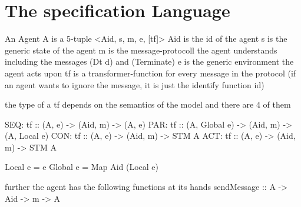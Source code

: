 \section{The specification Language}
An Agent A is a 5-tuple <Aid, s, m, e, [tf]>
Aid is the id of the agent
s is the generic state of the agent
m is the message-protocoll the agent understands including the messages (Dt d) and (Terminate)
e is the generic environment the agent acts upon
tf is a transformer-function for every message in the protocol (if an agent wants to ignore the message, it is just the identify function id)

the type of a tf depends on the semantics of the model and there are 4 of them

SEQ: tf :: (A, e) -> (Aid, m) -> (A, e)
PAR: tf :: (A, Global e) -> (Aid, m) -> (A, Local e)
CON: tf :: (A, e) -> (Aid, m) -> STM A
ACT: tf :: (A, e) -> (Aid, m) -> STM A

Local e = e
Global e = Map Aid (Local e)

further the agent has the following functions at its hands
sendMessage :: A -> Aid -> m -> A



